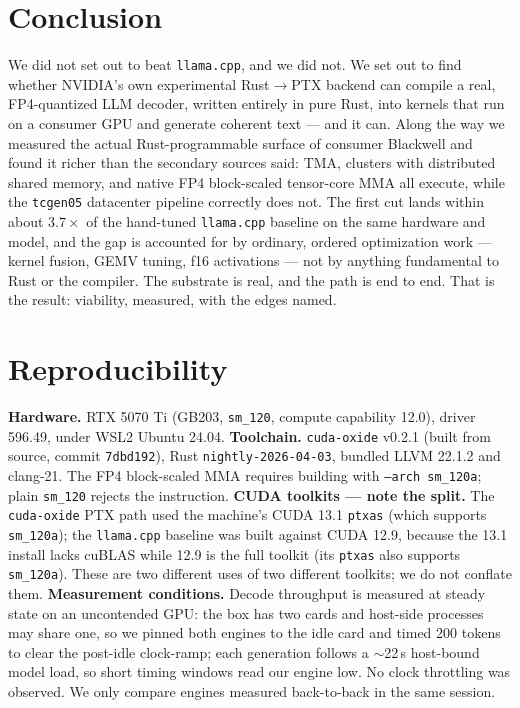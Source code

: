 \documentclass[11pt]{article}
\begin{document}
\section{Conclusion}
We did not set out to beat \texttt{llama.cpp}, and we did not. We set out to find whether NVIDIA's own experimental Rust$\rightarrow$PTX backend can compile a real, FP4-quantized LLM decoder, written entirely in pure Rust, into kernels that run on a consumer GPU and generate coherent text --- and it can. Along the way we measured the actual Rust-programmable surface of consumer Blackwell and found it richer than the secondary sources said: TMA, clusters with distributed shared memory, and native FP4 block-scaled tensor-core MMA all execute, while the \texttt{tcgen05} datacenter pipeline correctly does not. The first cut lands within about $3.7\times$ of the hand-tuned \texttt{llama.cpp} baseline on the same hardware and model, and the gap is accounted for by ordinary, ordered optimization work --- kernel fusion, GEMV tuning, f16 activations --- not by anything fundamental to Rust or the compiler. The substrate is real, and the path is end to end. That is the result: viability, measured, with the edges named.

\appendix
\section{Reproducibility}
\label{sec:repro}
\textbf{Hardware.} RTX 5070 Ti (GB203, \texttt{sm\_120}, compute capability 12.0), driver 596.49, under WSL2 Ubuntu 24.04. \textbf{Toolchain.} \texttt{cuda-oxide} v0.2.1 (built from source, commit \texttt{7dbd192}), Rust \texttt{nightly-2026-04-03}, bundled LLVM 22.1.2 and clang-21. The FP4 block-scaled MMA requires building with \texttt{--arch sm\_120a}; plain \texttt{sm\_120} rejects the instruction. \textbf{CUDA toolkits --- note the split.} The \texttt{cuda-oxide} PTX path used the machine's CUDA 13.1 \texttt{ptxas} (which supports \texttt{sm\_120a}); the \texttt{llama.cpp} baseline was built against CUDA 12.9, because the 13.1 install lacks cuBLAS while 12.9 is the full toolkit (its \texttt{ptxas} also supports \texttt{sm\_120a}). These are two different uses of two different toolkits; we do not conflate them. \textbf{Measurement conditions.} Decode throughput is measured at steady state on an uncontended GPU: the box has two cards and host-side processes may share one, so we pinned both engines to the idle card and timed 200 tokens to clear the post-idle clock-ramp; each generation follows a $\sim$22\,s host-bound model load, so short timing windows read our engine low. No clock throttling was observed. We only compare engines measured back-to-back in the same session.
\end{document}
